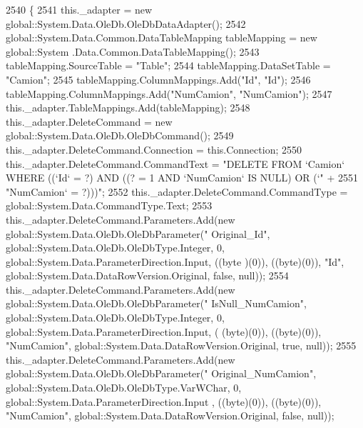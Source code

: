 \begin{DoxyCode}
2540                                    \{
2541             this.\_adapter = \textcolor{keyword}{new} global::System.Data.OleDb.OleDbDataAdapter();
2542             global::System.Data.Common.DataTableMapping tableMapping = \textcolor{keyword}{new} global::System
      .Data.Common.DataTableMapping();
2543             tableMapping.SourceTable = \textcolor{stringliteral}{"Table"};
2544             tableMapping.DataSetTable = \textcolor{stringliteral}{"Camion"};
2545             tableMapping.ColumnMappings.Add(\textcolor{stringliteral}{"Id"}, \textcolor{stringliteral}{"Id"});
2546             tableMapping.ColumnMappings.Add(\textcolor{stringliteral}{"NumCamion"}, \textcolor{stringliteral}{"NumCamion"});
2547             this.\_adapter.TableMappings.Add(tableMapping);
2548             this.\_adapter.DeleteCommand = \textcolor{keyword}{new} global::System.Data.OleDb.OleDbCommand();
2549             this.\_adapter.DeleteCommand.Connection = this.Connection;
2550             this.\_adapter.DeleteCommand.CommandText = \textcolor{stringliteral}{"DELETE FROM `Camion` WHERE ((`Id` = ?) AND ((? = 1
       AND `NumCamion` IS NULL) OR (`"} +
2551                 \textcolor{stringliteral}{"NumCamion` = ?)))"};
2552             this.\_adapter.DeleteCommand.CommandType = global::System.Data.CommandType.Text;
2553             this.\_adapter.DeleteCommand.Parameters.Add(\textcolor{keyword}{new} global::System.Data.OleDb.OleDbParameter(\textcolor{stringliteral}{"
      Original\_Id"}, global::System.Data.OleDb.OleDbType.Integer, 0, global::System.Data.ParameterDirection.Input, ((byte
      )(0)), ((byte)(0)), \textcolor{stringliteral}{"Id"}, global::System.Data.DataRowVersion.Original, \textcolor{keyword}{false}, null));
2554             this.\_adapter.DeleteCommand.Parameters.Add(\textcolor{keyword}{new} global::System.Data.OleDb.OleDbParameter(\textcolor{stringliteral}{"
      IsNull\_NumCamion"}, global::System.Data.OleDb.OleDbType.Integer, 0, global::System.Data.ParameterDirection.Input, (
      (byte)(0)), ((byte)(0)), \textcolor{stringliteral}{"NumCamion"}, global::System.Data.DataRowVersion.Original, \textcolor{keyword}{true}, null));
2555             this.\_adapter.DeleteCommand.Parameters.Add(\textcolor{keyword}{new} global::System.Data.OleDb.OleDbParameter(\textcolor{stringliteral}{"
      Original\_NumCamion"}, global::System.Data.OleDb.OleDbType.VarWChar, 0, global::System.Data.ParameterDirection.Input
      , ((byte)(0)), ((byte)(0)), \textcolor{stringliteral}{"NumCamion"}, global::System.Data.DataRowVersion.Original, \textcolor{keyword}{false}, null));

\end{DoxyCode}
